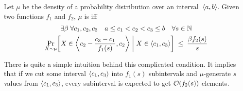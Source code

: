 
\begin{defn*} \label{def:smooth}
	Let $\mu$ be the density of a probability distribution over an interval~$\left\langle a,b\right\rangle$. Given two functions $f_1$ and $f_2$, $\mu$ is  iff
	\begin{multline*}
		\exists\beta \; \forall c_1,c_2,c_3 \quad a \le c_1 < c_2 < c_3 \le b \quad \forall s \in \mathbb{N} \\
		\Pr_{X \sim \mu}\!\left[  X \in \left\langle c_2 - \frac{c_3-c_1}{f_1(s)} ,c_2\right\rangle \; \middle| \; X \in \left\langle c_1,c_3\right\rangle  \right]
		\;\le\; \frac{\beta f_2(s)}{s}
	\end{multline*}
\end{defn*}

There is quite a simple intuition behind this complicated condition. It implies that if we cut some interval $\left\langle c_1,c_3\right\rangle$ into $f_1(s)$ subintervals and $\mu$-generate $s$ values from $\left\langle c_1,c_3\right\rangle$, every subinterval is expected to get $\mathcal O(f_2(s))$ elements.

